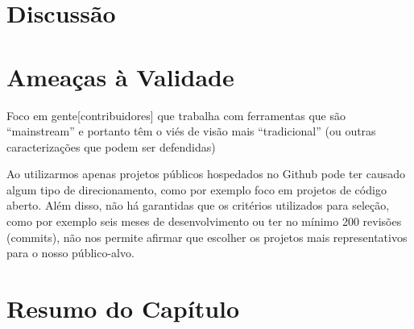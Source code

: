 \section{Discussão}
\label{sec:sug_melhoria_discussao}

\section{Ameaças à Validade}
\label{sec:sug_melhoria_ameacas}

Foco em gente[contribuidores] que trabalha com ferramentas que são
``mainstream'' e portanto têm o viés de visão mais ``tradicional'' (ou outras
caracterizações que podem ser defendidas)

Ao utilizarmos apenas projetos públicos hospedados no Github pode ter causado
algum tipo de direcionamento, como por exemplo foco em projetos de código
aberto. Além disso, não há garantidas que os critérios utilizados para seleção,
como por exemplo seis meses de desenvolvimento ou ter no mínimo 200 revisões
(commits), não nos permite afirmar que escolher os projetos mais
representativos para o nosso público-alvo.

\section{Resumo do Capítulo}
\label{sec:sug_melhoria_resumo}
